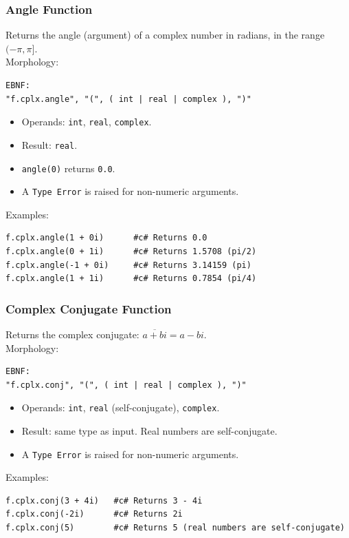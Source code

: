 \subsubsection{Angle Function}
Returns the angle (argument) of a complex number in radians, in the range $(-\pi, \pi]$. \\
Morphology:
\begin{verbatim}
EBNF:
"f.cplx.angle", "(", ( int | real | complex ), ")"
\end{verbatim}
\begin{itemize}
\item Operands: \texttt{int}, \texttt{real}, \texttt{complex}.
\item Result: \texttt{real}.
\item \texttt{angle(0)} returns \texttt{0.0}.
\item A \texttt{Type Error} is raised for non-numeric arguments.
\end{itemize}
Examples:
\begin{verbatim}
f.cplx.angle(1 + 0i)      #c# Returns 0.0
f.cplx.angle(0 + 1i)      #c# Returns 1.5708 (pi/2)
f.cplx.angle(-1 + 0i)     #c# Returns 3.14159 (pi)
f.cplx.angle(1 + 1i)      #c# Returns 0.7854 (pi/4)
\end{verbatim}

\subsubsection{Complex Conjugate Function}
Returns the complex conjugate: $\overline{a + bi} = a - bi$. \\
Morphology:
\begin{verbatim}
EBNF:
"f.cplx.conj", "(", ( int | real | complex ), ")"
\end{verbatim}
\begin{itemize}
\item Operands: \texttt{int}, \texttt{real} (self-conjugate), \texttt{complex}.
\item Result: same type as input. Real numbers are self-conjugate.
\item A \texttt{Type Error} is raised for non-numeric arguments.
\end{itemize}
Examples:
\begin{verbatim}
f.cplx.conj(3 + 4i)   #c# Returns 3 - 4i
f.cplx.conj(-2i)      #c# Returns 2i
f.cplx.conj(5)        #c# Returns 5 (real numbers are self-conjugate)
\end{verbatim}


